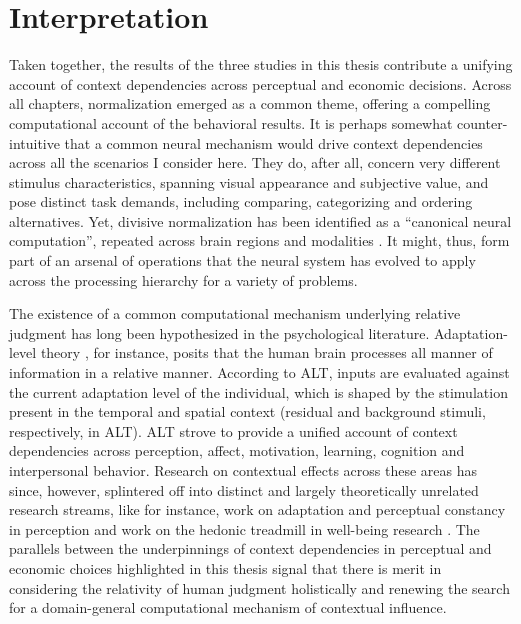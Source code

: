 \documentclass[a4paper, nobind]{templates/ociamthesis}
\begin{document}
\hypertarget{interpretation}{%
\section{Interpretation}\label{interpretation}}

Taken together, the results of the three studies in this thesis contribute a unifying account of context dependencies across perceptual and economic decisions. Across all chapters, normalization emerged as a common theme, offering a compelling computational account of the behavioral results. It is perhaps somewhat counter-intuitive that a common neural mechanism would drive context dependencies across all the scenarios I consider here. They do, after all, concern very different stimulus characteristics, spanning visual appearance and subjective value, and pose distinct task demands, including comparing, categorizing and ordering alternatives. Yet, divisive normalization has been identified as a ``canonical neural computation'', repeated across brain regions and modalities \autocite{carandini2012}. It might, thus, form part of an arsenal of operations that the neural system has evolved to apply across the processing hierarchy for a variety of problems.

The existence of a common computational mechanism underlying relative judgment has long been hypothesized in the psychological literature. Adaptation-level theory \autocite[ALT,][]{helson1964}, for instance, posits that the human brain processes all manner of information in a relative manner. According to ALT, inputs are evaluated against the current adaptation level of the individual, which is shaped by the stimulation present in the temporal and spatial context (residual and background stimuli, respectively, in ALT). ALT strove to provide a unified account of context dependencies across perception, affect, motivation, learning, cognition and interpersonal behavior. Research on contextual effects across these areas has since, however, splintered off into distinct and largely theoretically unrelated research streams, like for instance, work on adaptation and perceptual constancy in perception \autocite{smithson2005,webster2015} and work on the hedonic treadmill in well-being research \autocite{diener2009a}. The parallels between the underpinnings of context dependencies in perceptual and economic choices highlighted in this thesis signal that there is merit in considering the relativity of human judgment holistically and renewing the search for a domain-general computational mechanism of contextual influence.
\end{document}
